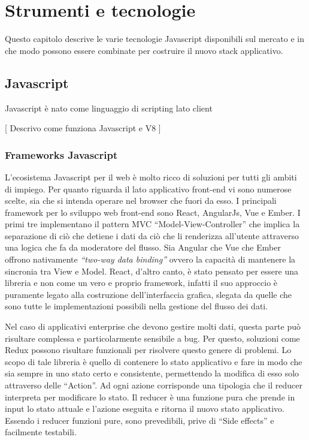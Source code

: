 \chapter{Strumenti e tecnologie}
\label{cha:intro}
\vspace{5mm}
Questo capitolo descrive le varie tecnologie Javascript disponibili sul mercato e in che modo possono essere combinate per costruire il nuovo stack applicativo.

\section{Javascript}\vspace{5mm}

Javascript è nato come linguaggio di scripting lato client 

[ Descrivo come funziona Javascript e V8 ]

\subsection{Frameworks Javascript}\vspace{5mm}

	L’ecosistema Javascript per il web è molto ricco di soluzioni per tutti gli ambiti di impiego. Per quanto riguarda il lato applicativo front-end vi sono numerose scelte, sia che si intenda operare nel browser che fuori da esso. I principali framework per lo sviluppo web front-end sono React, AngularJs, Vue e Ember. I primi tre implementano il pattern MVC “Model-View-Controller” che implica la separazione di ciò che detiene i dati da ciò che li renderizza all’utente attraverso una logica che fa da moderatore del flusso. Sia Angular che Vue che Ember offrono nativamente \emph{“two-way data binding”} ovvero la capacità di mantenere la sincronia tra View e Model. React, d’altro canto, è stato pensato per essere una libreria e non come un vero e proprio framework, infatti il suo approccio è puramente legato alla costruzione dell’interfaccia grafica, slegata da quelle che sono tutte le implementazioni possibili nella gestione del flusso dei dati. \vspace{5mm}

Nel caso di applicativi enterprise che devono gestire molti dati, questa parte può risultare complessa e particolarmente sensibile a bug. Per questo, soluzioni come Redux possono risultare funzionali per risolvere questo genere di problemi. Lo scopo di tale libreria è quello di contenere lo stato applicativo e fare in modo che sia sempre in uno stato certo e consistente, permettendo la modifica di esso solo attraverso delle “Action”. Ad ogni azione corrisponde una tipologia che il reducer interpreta per modificare lo stato. Il reducer è una funzione pura che prende in input lo stato attuale e l’azione eseguita e ritorna il nuovo stato applicativo. Essendo i reducer funzioni pure, sono prevedibili, prive di “Side effects” e facilmente testabili.\vspace{5mm} 

